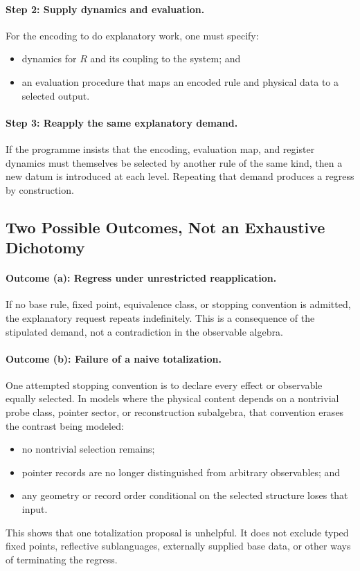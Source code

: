 \documentclass[12pt,a4paper,openany]{book}
\begin{document}
\paragraph{Step 2: Supply dynamics and evaluation.}
For the encoding to do explanatory work, one must specify:
\begin{itemize}
    \item dynamics for $R$ and its coupling to the system; and
    \item an evaluation procedure that maps an encoded rule and physical data to a selected output.
\end{itemize}

\paragraph{Step 3: Reapply the same explanatory demand.}
If the programme insists that the encoding, evaluation map, and register dynamics must themselves be selected by another rule of the same kind, then a new datum is introduced at each level.  Repeating that demand produces a regress by construction.

\subsection{Two Possible Outcomes, Not an Exhaustive Dichotomy}

\paragraph{Outcome (a): Regress under unrestricted reapplication.}
If no base rule, fixed point, equivalence class, or stopping convention is admitted, the explanatory request repeats indefinitely.  This is a consequence of the stipulated demand, not a contradiction in the observable algebra.

\paragraph{Outcome (b): Failure of a naive totalization.}
One attempted stopping convention is to declare every effect or observable equally selected.  In models where the physical content depends on a nontrivial probe class, pointer sector, or reconstruction subalgebra, that convention erases the contrast being modeled:
\begin{itemize}
    \item no nontrivial selection remains;
    \item pointer records are no longer distinguished from arbitrary observables; and
    \item any geometry or record order conditional on the selected structure loses that input.
\end{itemize}
This shows that one totalization proposal is unhelpful.  It does not exclude typed fixed points, reflective sublanguages, externally supplied base data, or other ways of terminating the regress.
\end{document}

